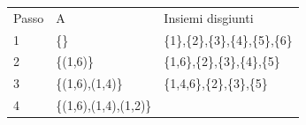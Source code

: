 \documentclass{article}
\begin{document}
{{\begin{longtable}[]{@{}lll@{}}
\toprule
\begin{minipage}[t]{0.30\columnwidth}\raggedright\strut
{Passo}\strut
\end{minipage} & \begin{minipage}[t]{0.30\columnwidth}\raggedright\strut
{A}\strut
\end{minipage} & \begin{minipage}[t]{0.30\columnwidth}\raggedright\strut
{Insiemi disgiunti}\strut
\end{minipage}\tabularnewline
\begin{minipage}[t]{0.30\columnwidth}\raggedright\strut
{1}\strut
\end{minipage} & \begin{minipage}[t]{0.30\columnwidth}\raggedright\strut
{\{\}}\strut
\end{minipage} & \begin{minipage}[t]{0.30\columnwidth}\raggedright\strut
{\{1\},\{2\},\{3\},\{4\},\{5\},\{6\}}\strut
\end{minipage}\tabularnewline
\begin{minipage}[t]{0.30\columnwidth}\raggedright\strut
{2}\strut
\end{minipage} & \begin{minipage}[t]{0.30\columnwidth}\raggedright\strut
{\{(1,6)\}}\strut
\end{minipage} & \begin{minipage}[t]{0.30\columnwidth}\raggedright\strut
{\{1,6\},\{2\},\{3\},\{4\},\{5\}}\strut
\end{minipage}\tabularnewline
\begin{minipage}[t]{0.30\columnwidth}\raggedright\strut
{3}\strut
\end{minipage} & \begin{minipage}[t]{0.30\columnwidth}\raggedright\strut
{\{(1,6),(1,4)\}}\strut
\end{minipage} & \begin{minipage}[t]{0.30\columnwidth}\raggedright\strut
{\{1,4,6\},\{2\},\{3\},\{5\}}\strut
\end{minipage}\tabularnewline
\begin{minipage}[t]{0.30\columnwidth}\raggedright\strut
{4}\strut
\end{minipage} & \begin{minipage}[t]{0.30\columnwidth}\raggedright\strut
{\{(1,6),(1,4),(1,2)\}}\strut
\end{minipage} & \begin{minipage}[t]{0.30\columnwidth}\raggedright\strut

\end{minipage}
\end{longtable}}}
\end{document}
